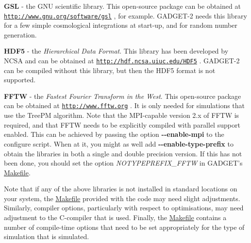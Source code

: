 \begin{DoxyItemize}
\item {\bfseries GSL} -\/ the GNU scientific library. This open-\/source package can be obtained at \href{http://www.gnu.org/software/gsl}{\tt http://www.gnu.org/software/gsl} , for example. GADGET-\/2 needs this library for a few simple cosmological integrations at start-\/up, and for random number generation.
\end{DoxyItemize}


\begin{DoxyItemize}
\item {\bfseries HDF5} -\/ the {\itshape Hierarchical Data Format\/}. This library has been developed by NCSA and can be obtained at \href{http://hdf.ncsa.uiuc.edu/HDF5}{\tt http://hdf.ncsa.uiuc.edu/HDF5} . GADGET-\/2 can be compiled without this library, but then the HDF5 format is not supported.
\end{DoxyItemize}


\begin{DoxyItemize}
\item {\bfseries FFTW} -\/ the {\itshape Fastest Fourier Transform in the West\/}. This open-\/source package can be obtained at \href{http://www.fftw.org}{\tt http://www.fftw.org} . It is only needed for simulations that use the TreePM algorithm. Note that the MPI-\/capable version 2.x of FFTW is required, and that FFTW needs to be explicitly compiled with parallel support enabled. This can be achieved by passing the option {\bfseries -\/-\/enable-\/mpi} to the configure script. When at it, you might as well add {\bfseries -\/-\/enable-\/type-\/prefix} to obtain the libraries in both a single and double precision version. If this has not been done, you should set the option {\itshape NOTYPEPREFIX\_\-FFTW\/} in GADGET's \hyperlink{Gadget-Makefile}{Makefile}.
\end{DoxyItemize}

Note that if any of the above libraries is not installed in standard locations on your system, the \hyperlink{Gadget-Makefile}{Makefile} provided with the code may need slight adjustments. Similarly, compiler options, particularly with respect to optimisations, may need adjustment to the C-\/compiler that is used. Finally, the \hyperlink{Gadget-Makefile}{Makefile} contains a number of compile-\/time options that need to be set appropriately for the type of simulation that is simulated.

